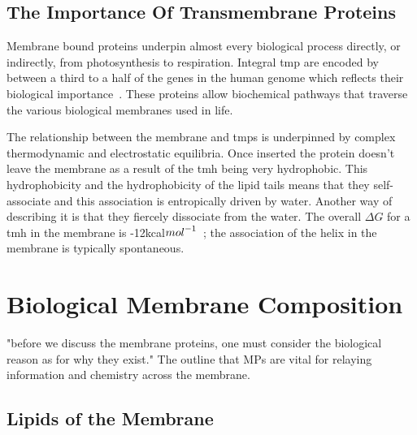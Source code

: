 

\subsection{The Importance Of Transmembrane Proteins}
Membrane bound proteins underpin almost every biological process directly, or indirectly, from photosynthesis to respiration.
Integral \gls{tmp} are encoded by between a third to a half of the genes in the human genome which reflects their biological importance~\cite{Hopkins2002, Almen2009, Wang2013}.
These proteins allow biochemical pathways that traverse the various biological membranes used in life.

The relationship between the membrane and \gls{tmp}s is underpinned by complex thermodynamic and electrostatic equilibria.
Once inserted the protein doesn't leave the membrane as a result of the \gls{tmh} being very hydrophobic.
This hydrophobicity and the hydrophobicity of the lipid tails means that they self-associate and this association is entropically driven by water.
Another way of describing it is that they fiercely dissociate from the water.
The overall $\Delta G$ for a \gls{tmh} in the membrane is -12kcal${mol}^{\--1}$~\cite{Cymer2015}; the association of the helix in the membrane is typically spontaneous.

\section{Biological Membrane Composition}

"before we discuss the membrane proteins, one must consider the biological reason as for why they exist."
The outline that MPs are vital for relaying information and chemistry across the membrane.
\subsection{Lipids of the Membrane}

